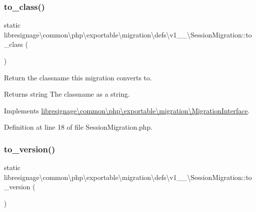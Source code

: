 \subsubsection{\texorpdfstring{to\+\_\+class()}{to\_class()}}
{\footnotesize\ttfamily static libresignage\textbackslash{}common\textbackslash{}php\textbackslash{}exportable\textbackslash{}migration\textbackslash{}defs\textbackslash{}v1\+\_\+\_\textbackslash{}\+Session\+Migration\+::to\+\_\+class (\begin{DoxyParamCaption}{ }\end{DoxyParamCaption})\hspace{0.3cm}{\ttfamily [static]}}

Return the classname this migration converts to.

\begin{DoxyReturn}{Returns}
string The classname as a string. 
\end{DoxyReturn}


Implements \hyperlink{interfacelibresignage_1_1common_1_1php_1_1exportable_1_1migration_1_1MigrationInterface_ab1f33cdd8684595d6b000bcbc7c4d5a4}{libresignage\textbackslash{}common\textbackslash{}php\textbackslash{}exportable\textbackslash{}migration\textbackslash{}\+Migration\+Interface}.



Definition at line 18 of file Session\+Migration.\+php.

\mbox{\label{classlibresignage_1_1common_1_1php_1_1exportable_1_1migration_1_1defs_1_1v1__1__0_1_1SessionMigration_abcbefa69fc1a771be466bcc364dfe822}} 
\subsubsection{\texorpdfstring{to\+\_\+version()}{to\_version()}}
{\footnotesize\ttfamily static libresignage\textbackslash{}common\textbackslash{}php\textbackslash{}exportable\textbackslash{}migration\textbackslash{}defs\textbackslash{}v1\+\_\+\_\textbackslash{}\+Session\+Migration\+::to\+\_\+version (\begin{DoxyParamCaption}{ }\end{DoxyParamCaption})\hspace{0.3cm}{\ttfamily [static]}}

